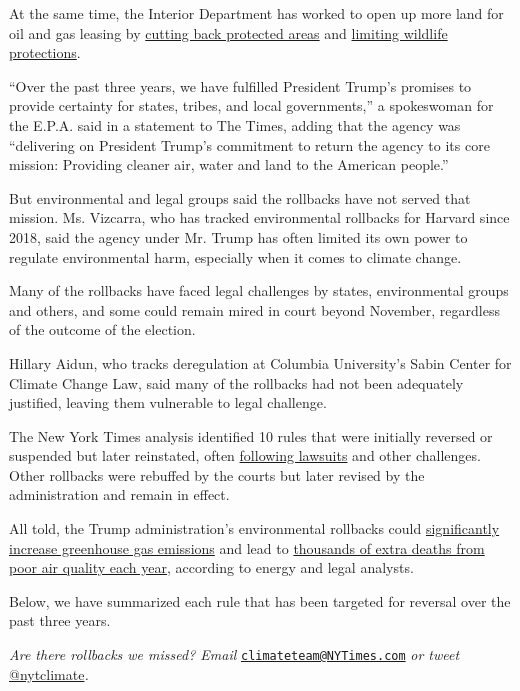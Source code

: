 At the same time, the Interior Department has worked to open up more
land for oil and gas leasing by
\href{https://www.nytimes3xbfgragh.onion/2017/12/04/us/trump-bears-ears.html}{cutting
back protected areas} and
\href{https://www.nytimes3xbfgragh.onion/2019/03/15/climate/trump-sage-grouse.html}{limiting
wildlife protections}.

``Over the past three years, we have fulfilled President Trump's
promises to provide certainty for states, tribes, and local
governments,'' a spokeswoman for the E.P.A. said in a statement to The
Times, adding that the agency was ``delivering on President Trump's
commitment to return the agency to its core mission: Providing cleaner
air, water and land to the American people.''

But environmental and legal groups said the rollbacks have not served
that mission. Ms. Vizcarra, who has tracked environmental rollbacks for
Harvard since 2018, said the agency under Mr. Trump has often limited
its own power to regulate environmental harm, especially when it comes
to climate change.

Many of the rollbacks have faced legal challenges by states,
environmental groups and others, and some could remain mired in court
beyond November, regardless of the outcome of the election.

Hillary Aidun, who tracks deregulation at Columbia University's Sabin
Center for Climate Change Law, said many of the rollbacks had not been
adequately justified, leaving them vulnerable to legal challenge.

The New York Times analysis identified 10 rules that were initially
reversed or suspended but later reinstated, often
\href{https://www.nytimes3xbfgragh.onion/2017/10/06/climate/trump-administration-environmental-regulations.html}{following
lawsuits} and other challenges. Other rollbacks were rebuffed by the
courts but later revised by the administration and remain in effect.

All told, the Trump administration's environmental rollbacks could
\href{https://rhg.com/research/fuel-economy-1-5/}{significantly increase
greenhouse gas emissions} and lead to
\href{https://www.law.nyu.edu/sites/default/files/climate-and-health-showdown-in-the-courts.pdf}{thousands
of extra deaths from poor air quality each year}, according to energy
and legal analysts.

Below, we have summarized each rule that has been targeted for reversal
over the past three years.

\emph{Are there rollbacks we missed? Email}
\href{mailto:climateteam@NYTimes.com}{\nolinkurl{climateteam@NYTimes.com}}
\emph{or tweet}
\href{https://twitter.com/nytclimate}{@nytclimate}\emph{.}


